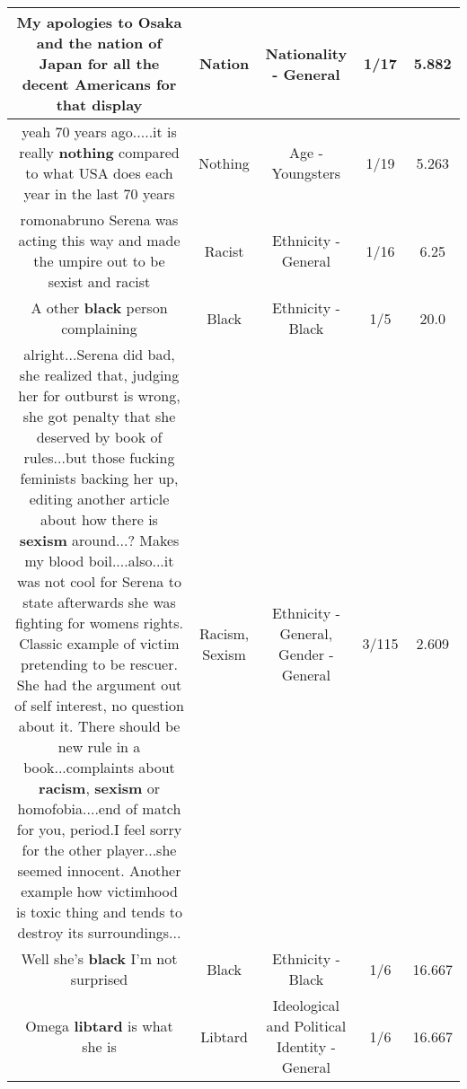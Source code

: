 \documentclass[11pt]{article}
\newlength\mylength
\begin{document}
\begin{center}
\begin{longtable}{|C{.65\mylength}|C{.30\mylength}|C{.12\mylength}|C{.12\mylength}|C{.12\mylength}|}
  \small My apologies to Osaka and the \textbf{nation} of Japan for all the decent Americans for that display\normalsize   & Nation & Nationality - General & 1/17 & 5.882 \\  \hline
  \small yeah 70 years ago.....it is really \textbf{nothing} compared to what USA does each year in the last 70 years\normalsize   & Nothing & Age - Youngsters & 1/19 & 5.263 \\  \hline
  \small romonabruno Serena was acting this way and made the umpire out to be sexist and racist\normalsize   & Racist & Ethnicity - General & 1/16 & 6.25 \\  \hline
  \small A other \textbf{black} person complaining\normalsize   & Black & Ethnicity - Black & 1/5 & 20.0 \\  \hline
  \small alright...Serena did bad, she realized that, judging her for outburst is wrong, she got penalty that she deserved by book of rules...but those fucking feminists backing her up, editing another article about how there is \textbf{sexism} around...? Makes my blood boil....also...it was not cool for Serena to state afterwards she was fighting for womens rights. Classic example of victim pretending to be rescuer.  She had the argument out of self interest, no question about it. There should be new rule in a book...complaints about \textbf{racism}, \textbf{sexism} or homofobia....end of match for you, period.I feel sorry for the other player...she seemed innocent. Another example how victimhood is toxic thing and tends to destroy its surroundings...\normalsize   & Racism, Sexism & Ethnicity - General, Gender - General & 3/115 & 2.609 \\  \hline
  \small Well she's \textbf{black} I'm not surprised\normalsize   & Black & Ethnicity - Black & 1/6 & 16.667 \\  \hline
  \small Omega \textbf{libtard} is what she is\normalsize   & Libtard &  Ideological and Political Identity - General & 1/6 & 16.667 \\  \hline

\end{longtable}
\end{center}
\end{document}
